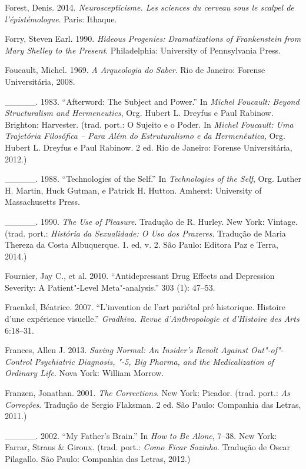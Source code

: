 {\begin{Parskip}
Forest, Denis. 2014. \emph{Neuroscepticisme. Les sciences du cerveau
sous le scalpel de l'épistémologue}. Paris: Ithaque.

Forry, Steven Earl. 1990. \emph{Hideous Progenies: Dramatizations of
Frankenstein from Mary Shelley to the Present}. Philadelphia: University
of Pennsylvania Press.

Foucault, Michel. 1969. \emph{A Arqueologia do Saber}. Rio de Janeiro:
Forense Universitária, 2008.

\_\_\_\_\_. 1983. ``Afterword: The Subject and Power.'' In \emph{Michel
Foucault: Beyond Structuralism and Hermeneutics}, Org. Hubert L. Dreyfus
e Paul Rabinow. Brighton: Harvester. (trad. port.: O Sujeito e o Poder.
In \emph{Michel Foucault: Uma Trajetória Filosófica -- Para Além do
Estruturalismo e da Hermenêutica}, Org. Hubert L. Dreyfus e Paul
Rabinow. 2 ed. Rio de Janeiro: Forense Universitária, 2012.)

\_\_\_\_\_. 1988. ``Technologies of the Self.'' In \emph{Technologies of
the Self}, Org. Luther H. Martin, Huck Gutman, e Patrick H. Hutton.
Amherst: University of Massachusetts Press.

\_\_\_\_\_. 1990. \emph{The Use of Pleasure}. Tradução de R. Hurley. New
York: Vintage. (trad. port.: \emph{História da Sexualidade: O Uso dos
Prazeres}. Tradução de Maria Thereza da Costa Albuquerque. 1. ed, v. 2.
São Paulo: Editora Paz e Terra, 2014.)

Fournier, Jay C., et al. 2010. ``Antidepressant Drug Effects and
Depression Severity: A Patient"-Level Meta"-analysis.'' \emph{} 303
(1): 47--53.

Fraenkel, Béatrice. 2007. ``L'invention de l'art pariétal pré
historique. Histoire d'une expérience visuelle.'' \emph{Gradhiva. Revue
d'Anthropologie et d'Histoire des Arts} 6:18--31.

Frances, Allen J. 2013. \emph{Saving Normal: An Insider's Revolt Against
Out"-of"-Control Psychiatric Diagnosis, "-5, Big Pharma, and the
Medicalization of Ordinary Life}. Nova York: William Morrow.

Franzen, Jonathan. 2001. \emph{The Corrections}. New York: Picador.
(trad. port.: \emph{As Correções}. Tradução de Sergio Flaksman. 2 ed.
São Paulo: Companhia das Letras, 2011.)

\_\_\_\_\_. 2002. ``My Father's Brain.'' In \emph{How to Be Alone},
7--38. New York: Farrar, Straus \& Giroux. (trad. port.: \emph{Como
Ficar Sozinho}. Tradução de Oscar Pilagallo. São Paulo: Companhia das
Letras, 2012.)


\end{Parskip}}
